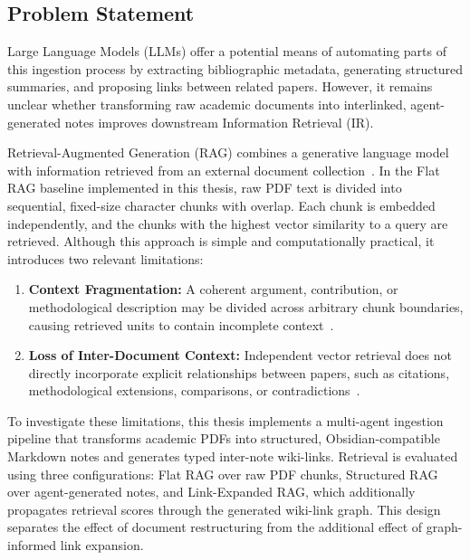 \documentclass[runningheads]{llncs}
\begin{document}
\subsection{Problem Statement}

Large Language Models (LLMs) offer a potential means of automating parts of this ingestion process by extracting bibliographic metadata, generating structured summaries, and proposing links between related papers. However, it remains unclear whether transforming raw academic documents into interlinked, agent-generated notes improves downstream Information Retrieval (IR).

Retrieval-Augmented Generation (RAG) combines a generative language model with information retrieved from an external document collection~\cite{lewis2020retrieval}. In the Flat RAG baseline implemented in this thesis, raw PDF text is divided into sequential, fixed-size character chunks with overlap. Each chunk is embedded independently, and the chunks with the highest vector similarity to a query are retrieved. Although this approach is simple and computationally practical, it introduces two relevant limitations:

\begin{enumerate}
\item \textbf{Context Fragmentation:} A coherent argument, contribution, or methodological description may be divided across arbitrary chunk boundaries, causing retrieved units to contain incomplete context~\cite{sarthi2024raptor}.

\item \textbf{Loss of Inter-Document Context:} Independent vector retrieval does not directly incorporate explicit relationships between papers, such as citations, methodological extensions, comparisons, or contradictions~\cite{edge2024local,gutierrez2024hipporag}.

\end{enumerate}

To investigate these limitations, this thesis implements a multi-agent ingestion pipeline that transforms academic PDFs into structured, Obsidian-compatible Markdown notes and generates typed inter-note wiki-links. Retrieval is evaluated using three configurations: Flat RAG over raw PDF chunks, Structured RAG over agent-generated notes, and Link-Expanded RAG, which additionally propagates retrieval scores through the generated wiki-link graph. This design separates the effect of document restructuring from the additional effect of graph-informed link expansion.
\end{document}
